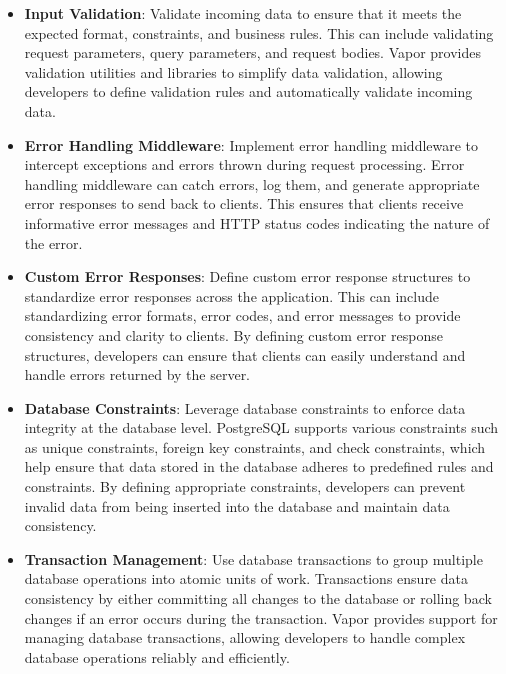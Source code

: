 \documentclass[
  biblatex,
  language=english,
  figures=false,
  sourcecodes,
  glossaries,
  index
]{kidiplom}
\begin{document}
\begin{itemize}
    \item \textbf{Input Validation}: Validate incoming data to ensure that it meets the expected format, constraints, and business rules. This can include validating request parameters, query parameters, and request bodies. Vapor provides validation utilities and libraries to simplify data validation, allowing developers to define validation rules and automatically validate incoming data.
    
    \item \textbf{Error Handling Middleware}: Implement error handling middleware to intercept exceptions and errors thrown during request processing. Error handling middleware can catch errors, log them, and generate appropriate error responses to send back to clients. This ensures that clients receive informative error messages and HTTP status codes indicating the nature of the error.
    
    \item \textbf{Custom Error Responses}: Define custom error response structures to standardize error responses across the application. This can include standardizing error formats, error codes, and error messages to provide consistency and clarity to clients. By defining custom error response structures, developers can ensure that clients can easily understand and handle errors returned by the server.
    
    \item \textbf{Database Constraints}: Leverage database constraints to enforce data integrity at the database level. PostgreSQL supports various constraints such as unique constraints, foreign key constraints, and check constraints, which help ensure that data stored in the database adheres to predefined rules and constraints. By defining appropriate constraints, developers can prevent invalid data from being inserted into the database and maintain data consistency.
    
    \item \textbf{Transaction Management}: Use database transactions to group multiple database operations into atomic units of work. Transactions ensure data consistency by either committing all changes to the database or rolling back changes if an error occurs during the transaction. Vapor provides support for managing database transactions, allowing developers to handle complex database operations reliably and efficiently.
\end{itemize}
\end{document}
